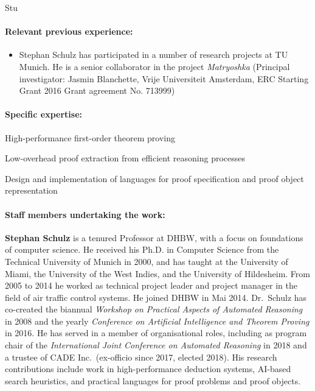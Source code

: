 \begin{sitedescription}{Stu}
\begin{compactitem}
\item
\end{compactitem}


\paragraph{Relevant previous experience:}

\begin{itemize}
\item Stephan Schulz has participated in a number of research projects
  at TU Munich. He is a senior collaborator in the project
  \emph{Matryoshka} (Principal investigator: Jasmin Blanchette, Vrije
  Universiteit Amsterdam, ERC Starting Grant 2016 Grant agreement
  No. 713999)
\end{itemize}

\paragraph{Specific expertise:}

\begin{compactitem}
\item High-performance first-order theorem proving
\item Low-overhead proof extraction from efficient reasoning processes
\item Design and implementation of languages for proof specification
  and proof object representation
\end{compactitem}

\paragraph{Staff members undertaking the work:}


\textbf{Stephan Schulz} is a tenured Professor at DHBW, with a focus
on foundations of computer science. He received his Ph.D. in Computer
Science from the Technical University of Munich in 2000, and has
taught at the University of Miami, the University of the West Indies,
and the University of Hildesheim. From 2005 to 2014 he worked as
technical project leader and project manager in the field of air
traffic control systems. He joined DHBW in Mai 2014. Dr.\ Schulz has
co-created the biannual \emph{Workshop on Practical Aspects of
  Automated Reasoning} in 2008 and the yearly \emph{Conference on
  Artificial Intelligence and Theorem Proving} in 2016. He has served
in a member of organisational roles, including as program chair of the
\emph{International Joint Conference on Automated Reasoning} in 2018
and a trustee of CADE Inc.\ (ex-officio since 2017, elected 2018). His
research contributions include work in high-performance deduction
systems, AI-based search heuristics, and practical languages for proof
problems and proof objects.


\end{sitedescription}
